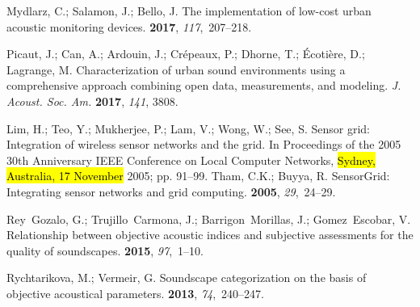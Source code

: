 \documentclass[sensors,article,accept,moreauthors,pdftex,10pt,a4paper]{mdpi}
\begin{document}
%
\begin{thebibliography}{999}
\providecommand{\natexlab}[1]{#1}

Mydlarz, C.; Salamon, J.; Bello, J.
\newblock The implementation of low-cost urban acoustic monitoring devices.
 {\bf 2017}, {\em 117},~207--218.

Picaut, J.; Can, A.; Ardouin, J.; Cr{\'e}peaux, P.; Dhorne, T.;
  {\'E}coti{\`e}re, D.; Lagrange, M.
\newblock Characterization of urban sound environments using a comprehensive
  approach combining open data, measurements, and modeling.
\newblock   \emph{J. Acoust. Soc. Am. }  \textbf{2017}, \emph{141}, 3808.

Lim, H.; Teo, Y.; Mukherjee, P.; Lam, V.; Wong, W.; See, S.
\newblock Sensor grid: Integration of wireless sensor networks and the grid.
\newblock In Proceedings of the 2005 30th Anniversary IEEE Conference on Local Computer Networks, \hl{Sydney,  Australia, 17 November } 2005; pp. 91--99.
Tham, C.K.; Buyya, R.
\newblock SensorGrid: Integrating sensor networks and grid computing.
 {\bf 2005}, {\em 29},~24--29.

Rey~Gozalo, G.; Trujillo~Carmona, J.; Barrigon~Morillas, J.; Gomez~Escobar, V.
\newblock Relationship between objective acoustic indices and subjective
  assessments for the quality of soundscapes.
 {\bf 2015}, {\em 97},~1--10.

Rychtarikova, M.; Vermeir, G.
\newblock Soundscape categorization on the basis of objective acoustical
  parameters.
 {\bf 2013}, {\em 74},~240--247.


\end{thebibliography}
\end{document}
